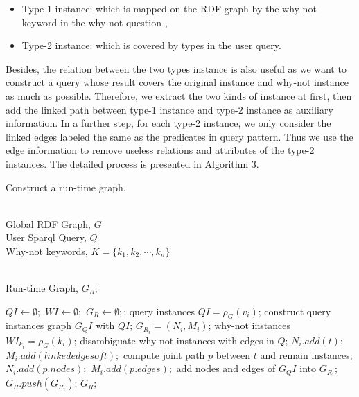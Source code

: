 \documentclass{article}
\begin{document}
\begin{itemize}
\item Type-1 instance: which is mapped on the RDF graph by the why not keyword in the why-not question ,
\item Type-2 instance: which is covered by types in the user query.
\end{itemize}

Besides, the relation between the two types instance is also useful as we want to construct a query whose result covers the original instance and why-not instance as much as possible. Therefore, we extract the two kinds of instance at first, then add the linked path between type-1 instance and type-2 instance as auxiliary information. In a further step, for each type-2 instance, we only consider the linked edges labeled the same as the predicates in query pattern. Thus we use the edge information to remove useless relations and attributes of the type-2 instances. The detailed process is presented in Algorithm 3.


\begin{algorithm}[htb]         %
\caption{ Construct a run-time graph.} %
\label{alg3:Framwork}                  %
\begin{algorithmic}[1]                %

\REQUIRE ~~\\                         %
    Global RDF Graph, $G$\\
    User Sparql Query, $Q$\\
    Why-not keywords, $K=\{k_1,k_2,\cdots,k_n\}$

\ENSURE ~~\\                          %
    Run-time Graph, $G_R$;

\STATE $QI \leftarrow \emptyset;$  $WI \leftarrow \emptyset;$  $G_R \leftarrow \emptyset;$;
\STATE query instances $QI = \rho_G(v_i)$;
\ENDFOR
\STATE construct query instances graph $G_QI$ with $QI$;
\STATE $G_{R_i} = (N_i, M_i)$;
\STATE why-not instances $WI_{k_i} = \rho_G(k_i)$;
\STATE disambiguate why-not instances with edges in $Q$;
\STATE $N_i.add(t);$  $M_i.add(linked edges of t);$
\STATE compute joint path $p$ between $t$ and remain instances;
\STATE $N_i.add(p.nodes);$  $M_i.add(p.edges);$
\STATE add nodes and edges of $G_QI$ into $G_{R_i}$;
\ENDFOR
\STATE $G_R.push(G_{R_i})$;
\ENDFOR
\RETURN $G_R$;                %

\end{algorithmic}
\end{algorithm}
\end{document}
